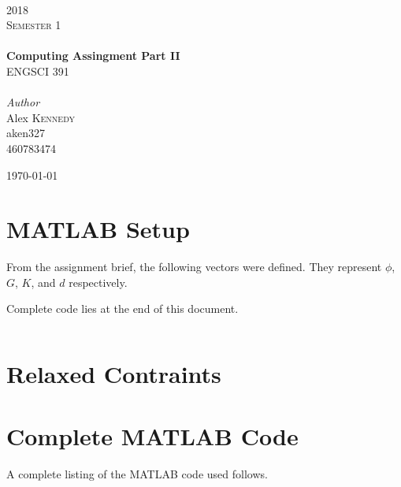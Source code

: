 \documentclass[11pt]{article}
\begin{document}
\begin{titlepage}
	\newcommand{\HRule}{\rule{\linewidth}{0.5mm}} %

	\center


	\textsc{\LARGE }\\[1.5cm]
	\textsc{\Large 2018}\\[0.5cm]
	\textsc{\large Semester 1}\\[1cm]

	{
	}\\[0.4cm]

	{\huge\bfseries Computing Assingment Part II}\\[0.6cm]
	{\large ENGSCI 391}\\[1cm]

	{
	}\\[1cm]

	{\large\textit{Author}}\\
	Alex \textsc{Kennedy\\[1cm]}
	aken327\\
	460783474

	\vfill\vfill\vfill
	{\large\today}
	\vfill

\end{titlepage}

\section*{MATLAB Setup}

From the assignment brief, the following vectors were defined. They represent $\phi$, $G$, $K$, and $d$ respectively. 

Complete code lies at the end of this document.

\inputminted[firstline=1, lastline=4]{matlab}{main.m}

\section*{Relaxed Contraints}



\newpage
\section*{Complete MATLAB Code}
A complete listing of the MATLAB code used follows. 

\inputminted{matlab}{main.m}
\end{document}
